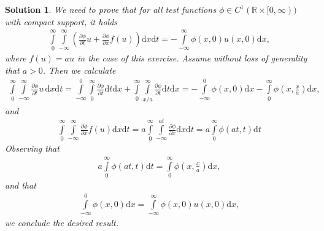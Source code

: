 \documentclass[10pt,letterpaper]{article}
\theoremstyle{break}
\newtheorem{mysolution}{Solution}
\newenvironment{solution}{\begin{mysolution}}{\end{mysolution}}
\begin{document}
\begin{solution}
    We need to prove that for all test functions $\phi \in C^1(\mathbb{R} \times [0,\infty))$
    with compact support, it holds 
    \begin{align}
    	\int\limits_{0}^{\infty}
    	\int\limits_{-\infty}^{\infty}
    	\left(
    		\frac{\partial \phi}{\partial t}
    		u
    		+
    		\frac{\partial \phi}{\partial x}
    		f(u)
    	\right)
    	\text{d}x \text{d} t
    	=
    	-
    	\int\limits_{-\infty}^{\infty}
    	\phi(x,0) u(x,0)
    	\text{d}x,
    \end{align}
    where $f(u) = au$ in the case of this exercise.
    Assume without loss of generality that $a>0$.
    Then we calculate 
    \begin{align}
    	\int\limits_{0}^{\infty}
    	\int\limits_{-\infty}^{\infty}
    	\frac{\partial \phi}{\partial t}
    	u \,
    	\text{d}x \text{d} t
    	=
    	\int\limits_{-\infty}^{0}
    	\int\limits_{0}^{\infty}
    	\frac{\partial \phi}{\partial t}
    	\text{d}t \text{d} x
    	+
    	\int\limits_{0}^{\infty}
    	\int\limits_{x/a}^{\infty}
    	\frac{\partial \phi}{\partial t}
    	\text{d}t \text{d} x
    	=
    	-
    	\int\limits_{-\infty}^{0}
    	\phi(x,0)
    	\text{d} x
    	-
    	\int\limits_{0}^{\infty}
    	\phi
    	\left(x,\frac{x}{a}\right)
    	\text{d} x,
    \end{align}
    and
    \begin{align}
    	\int\limits_{0}^{\infty}
    	\int\limits_{-\infty}^{\infty}
    	\frac{\partial \phi}{\partial x}
    	f(u)
    	\text{d}x \text{d} t
    	=
    	a
    	\int\limits_{0}^{\infty}
    	\int\limits_{-\infty}^{at}
    	\frac{\partial \phi}{\partial x}
    	\text{d}x \text{d} t
    	=
    	a
    	\int\limits_{0}^{\infty}
    	\phi
    	\left(at,t\right)
    	\text{d}t
    \end{align}
    Observing that
    \begin{align}
    	a
    	\int\limits_{0}^{\infty}
    	\phi
    	\left(at,t\right)
    	\text{d}t
    	=
    	\int\limits_{0}^{\infty}
    	\phi
    	\left(x,\frac{x}{a}\right)
    	\text{d} x,
    \end{align}
    and that
    \begin{align}
    	\int\limits_{-\infty}^{0}
    	\phi(x,0)
    	\text{d} x
    	=
    	\int\limits_{-\infty}^{\infty}
    	\phi(x,0)
    	u(x,0)
    	\text{d} x,
    \end{align}
    we conclude the desired result.
\end{solution}
\end{document}

